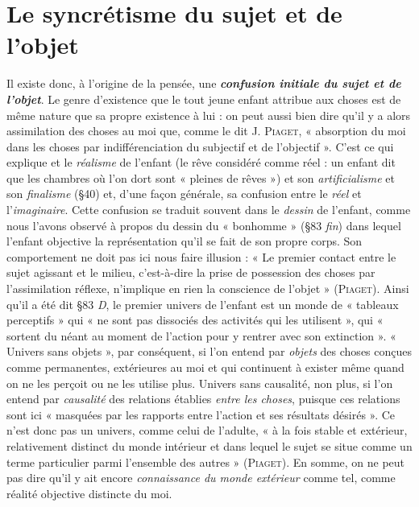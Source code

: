 \section{Le syncrétisme du sujet et de l’objet}%
Il existe donc,
à l’origine de la pensée, une \textbf{\textit {confusion initiale du sujet et de l’objet}}.
Le genre d’existence que le tout jeune enfant attribue aux choses
est de même nature que sa propre existence à lui : on peut aussi
bien dire qu’il y a alors assimilation des choses au moi que, comme le
dit J. \textsc{Piaget}, « absorption du moi dans les choses par indifférenciation
du subjectif et de l’objectif ». C’est ce qui explique et le {\it réalisme}
de l’enfant (le rêve considéré comme réel : un enfant dit que les
chambres où l’on dort sont « pleines de rêves ») et son {\it artificialisme}
et son {\it finalisme} (\S 40) et, d’une façon générale, sa confusion entre le
{\it réel} et l'{\it imaginaire}. Cette confusion se traduit souvent dans le {\it dessin}
de l'enfant, comme nous l’avons observé à propos du dessin du « bonhomme »
(\S 83 {\it fin}) dans lequel l'enfant objective la représentation
qu’il se fait de son propre corps. Son comportement ne doit pas ici
nous faire illusion : « Le premier contact entre le sujet agissant
et le milieu, c’est-à-dire la prise de possession des choses par l’assimilation
réflexe, n’implique en rien la conscience de l’objet » (\textsc{Piaget}).
Ainsi qu’il a été dit \S 83 {\it D}, le premier univers de l’enfant est un monde
de « tableaux perceptifs » qui « ne sont pas dissociés des activités qui
les utilisent », qui « sortent du néant au moment de l’action pour y
rentrer avec son extinction ». « Univers sans objets », par conséquent,
si l’on entend par {\it objets} des choses conçues comme permanentes,
extérieures au moi et qui continuent à exister même quand on ne les
perçoit ou ne les utilise plus. Univers sans causalité, non plus, si l’on
entend par {\it causalité} des relations établies {\it entre les choses}, puisque
ces relations sont ici « masquées par les rapports entre l’action et ses
résultats désirés ». Ce n’est donc pas un univers, comme celui de
l’adulte, « à la fois stable et extérieur, relativement distinct du monde
intérieur et dans lequel le sujet se situe comme un terme particulier
parmi l’ensemble des autres » (\textsc{Piaget}). En somme, on ne peut pas
dire qu’il y ait encore {\it connaissance du monde extérieur} comme tel,
comme réalité objective distincte du moi.

